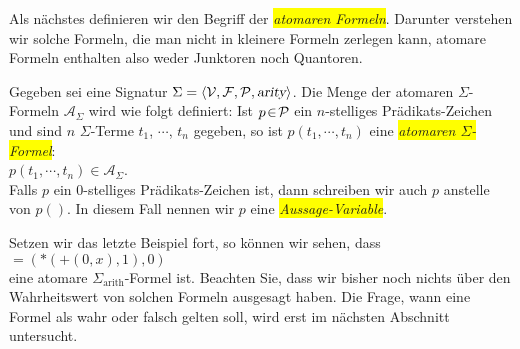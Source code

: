 Als n\"{a}chstes definieren wir den Begriff der \colorbox{yellow}{\emph{atomaren Formeln}}.  Darunter verstehen wir
solche Formeln, die man nicht in kleinere Formeln zerlegen kann, atomare Formeln enthalten also
weder Junktoren noch Quantoren. 
\begin{Definition}
  Gegeben sei eine Signatur $\Sigma = \langle \mathcal{V}, \mathcal{F}, \mathcal{P}, \textsl{arity} \rangle$. 
  Die Menge der atomaren $\Sigma$-Formeln $\mathcal{A}_\Sigma$
  wird wie folgt definiert:  Ist $p \!\in\! \mathcal{P}$ ein $n$-stelliges Pr\"{a}dikats-Zeichen
  und sind $n$ $\Sigma$-Terme $t_1$, $\cdots$, $t_n$ gegeben, so ist
  $p(t_1,\cdots,t_n)$ eine \colorbox{yellow}{\emph{atomaren $\Sigma$-Formel}}: \\[0.2cm]
  \hspace*{1.3cm} $p(t_1,\cdots,t_n) \in \mathcal{A}_\Sigma$.  \\[0.2cm]
  Falls $p$ ein 0-stelliges Pr\"{a}dikats-Zeichen ist, dann schreiben wir auch $p$ anstelle von $p()$.
  In diesem Fall nennen wir $p$ eine \colorbox{yellow}{\emph{Aussage-Variable}}.
  \eox
\end{Definition}

\example
Setzen wir das letzte Beispiel fort, so k\"{o}nnen wir sehen, dass \\[0.2cm]
\hspace*{1.3cm} $\mathtt{=}(*(\mathtt{+}(0,x),1),0)$ \\[0.2cm]
eine atomare $\Sigma_\mathrm{arith}$-Formel ist.  Beachten Sie, dass wir bisher noch nichts \"{u}ber den Wahrheitswert von solchen 
Formeln ausgesagt haben.  Die Frage, wann eine Formel als wahr oder falsch gelten soll,
wird erst im n\"{a}chsten Abschnitt untersucht.
\eox

